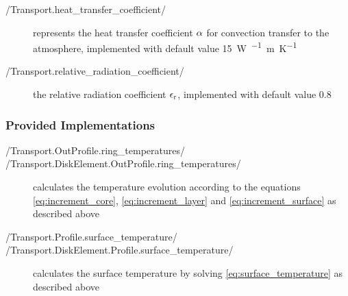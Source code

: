 \documentclass{PyRollDocs}
\begin{document}
    \begin{description}
        \item[\py/Transport.heat_transfer_coefficient/] represents the heat transfer coefficient ${\alpha}$ for convection transfer to the atmosphere, implemented with default value \qty{15}{\watt\per\squared\meter\per\kelvin}
        \item[\py/Transport.relative_radiation_coefficient/] the relative radiation coefficient ${\epsilon_\mathrm{r}}$, implemented with default value \num{0.8}
    \end{description}

    \subsubsection{Provided Implementations}

    \begin{description}
        \item[\py/Transport.OutProfile.ring_temperatures/]
        \item[\py/Transport.DiskElement.OutProfile.ring_temperatures/] calculates the temperature evolution according to the equations \autoref{eq:increment_core}, \autoref{eq:increment_layer} and \autoref{eq:increment_surface} as described above
        \item[\py/Transport.Profile.surface_temperature/]
        \item[\py/Transport.DiskElement.Profile.surface_temperature/] calculates the surface temperature by solving \autoref{eq:surface_temperature} as described above
    \end{description}

%    

    \printbibliography
\end{document}

